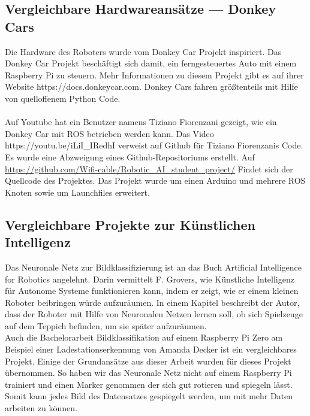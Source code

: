 \documentclass[conference]{IEEEtran}
\begin{document}
\subsection{Vergleichbare Hardwareansätze — Donkey Cars} %
Die Hardware des Roboters wurde vom Donkey Car Projekt inspiriert.
Das Donkey Car Projekt beschäftigt sich damit, ein ferngesteuertes Auto mit einem Raspberry Pi zu steuern.
Mehr Informationen zu diesem Projekt gibt es auf ihrer Website https://docs.donkeycar.com.
Donkey Cars fahren größtenteils mit Hilfe von quelloffenem Python Code. \\
\\
Auf Youtube hat ein Benutzer namens Tiziano Fiorenzani gezeigt, wie ein Donkey Car mit ROS betrieben werden kann.
Das Video https://youtu.be/iLiI\_IRedhI verweist auf Github für Tiziano 
Fiorenzanis Code. Es wurde eine Abzweigung eines Github-Repositoriums 
erstellt. Auf 
\url{https://github.com/Wifi-cable/Robotic_AI_student_project/}
Findet sich der Quellcode des Projektes. 
Das Projekt wurde um einen Arduino und mehrere ROS Knoten sowie um 
Launchfiles erweitert.


\subsection{Vergleichbare Projekte zur Künstlichen Intelligenz} %
Das Neuronale Netz zur Bildklassifizierung ist an das Buch \glqq Artificial Intelligence for Robotics\grqq  \cite{b1} angelehnt.
Darin vermittelt F. Grovers, wie Künstliche Intelligenz für Autonome Systeme funktionieren kann, indem er zeigt, wie er einem kleinen Roboter beibringen würde aufzuräumen.
In einem Kapitel beschreibt der Autor, dass der Roboter mit Hilfe von Neuronalen Netzen lernen soll, ob sich Spielzeuge auf dem Teppich befinden, um sie später aufzuräumen.\\

Auch die Bachelorarbeit \glqq Bildklassifikation auf einem Raspberry Pi Zero am Beispiel einer Ladestationserkennung \grqq \cite{b2} von Amanda Decker ist ein vergleichbares Projekt.
Einige der Grundansätze aus dieser Arbeit wurden für dieses Projekt übernommen.
So haben wir das Neuronale Netz nicht auf einem Raspberry Pi trainiert und einen Marker genommen der sich gut rotieren und spiegeln lässt.
Somit kann jedes Bild des Datensatzes gespiegelt werden, um mit mehr Daten arbeiten zu können.
\end{document}
